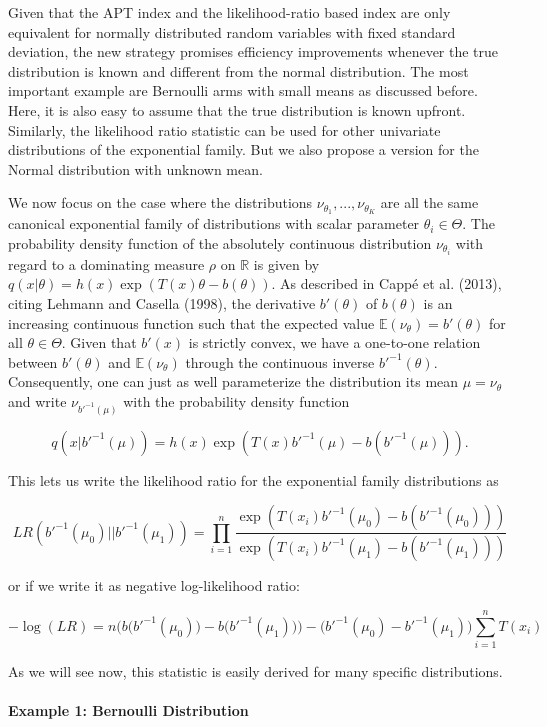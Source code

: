 \documentclass[12pt,]{article}
\let\oldparagraph\paragraph
\renewcommand{\paragraph}[1]{\oldparagraph{#1}\mbox{}}
\begin{document}
Given that the APT index and the likelihood-ratio based index are only
equivalent for normally distributed random variables with fixed standard
deviation, the new strategy promises efficiency improvements whenever
the true distribution is known and different from the normal
distribution. The most important example are Bernoulli arms with small
means as discussed before. Here, it is also easy to assume that the true
distribution is known upfront. Similarly, the likelihood ratio statistic
can be used for other univariate distributions of the exponential
family. But we also propose a version for the Normal distribution with
unknown mean.

We now focus on the case where the distributions
\(\nu_{\theta_1}, ..., \nu_{\theta_K}\) are all the same canonical
exponential family of distributions with scalar parameter
\(\theta_i \in \Theta\). The probability density function of the
absolutely continuous distribution \(\nu_{\theta_i}\) with regard to a
dominating measure \(\rho\) on \(\mathbb{R}\) is given by
\(q(x|\theta) = h(x) \exp(T(x)\theta - b(\theta))\). As described in
Cappé et al. (2013), citing Lehmann and Casella (1998), the derivative
\(b'(\theta)\) of \(b(\theta)\) is an increasing continuous function
such that the expected value \(\mathbb{E}(\nu_{\theta}) = b'(\theta)\)
for all \(\theta \in \Theta\). Given that \(b'(x)\) is strictly convex,
we have a one-to-one relation between \(b'(\theta)\) and
\(\mathbb{E}(\nu_{\theta})\) through the continuous inverse
\(b'^{-1}(\theta)\). Consequently, one can just as well parameterize the
distribution its mean \(\mu = \mathbb{\nu_{\theta}}\) and write
\(\nu_{b'^{-1}(\mu)}\) with the probability density function

\[
q(x|b'^{-1}(\mu)) = h(x) \exp(T(x) b'^{-1}(\mu) - b(b'^{-1}(\mu))).
\]

This lets us write the likelihood ratio for the exponential family
distributions as

\[
LR(b'^{-1}(\mu_0)||b'^{-1}(\mu_1)) = \prod_{i=1}^n \frac{\exp(T(x_i) b'^{-1}(\mu_0) - b(b'^{-1}(\mu_0)))}{\exp(T(x_i) b'^{-1}(\mu_1) - b(b'^{-1}(\mu_1)))}
\]

or if we write it as negative log-likelihood ratio:

\[
-\log(LR) = n\Big(b\big(b'^{-1}(\mu_0)) - b(b'^{-1}(\mu_1)\big)\Big) - \Big(b'^{-1}(\mu_0)-b'^{-1}(\mu_1)\Big)\sum_{i=1}^nT(x_i)
\]

As we will see now, this statistic is easily derived for many specific
distributions.

\paragraph{Example 1: Bernoulli
Distribution}\label{example-1-bernoulli-distribution}
\end{document}

